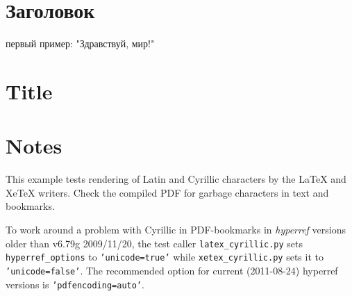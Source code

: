 \documentclass[a4paper,russian]{article}
\providecommand*{\DUroletitlereference}[1]{\textsl{#1}}
\begin{document}
\section{Заголовок%
  \label{id1}%
}

первый пример: "Здравствуй, мир!"


\section{Title%
  \label{title}%
}



\section{Notes%
  \label{notes}%
}

This example tests rendering of Latin and Cyrillic characters by the LaTeX
and XeTeX writers. Check the compiled PDF for garbage characters in text and
bookmarks.

To work around a problem with Cyrillic in PDF-bookmarks in \DUroletitlereference{hyperref}
versions older than v6.79g 2009/11/20, the test caller \texttt{latex\_cyrillic.py}
sets \texttt{hyperref\_options} to \texttt{'unicode=true'} while \texttt{xetex\_cyrillic.py}
sets it to \texttt{'unicode=false'}. The recommended option for current
(2011-08-24) hyperref versions is \texttt{'pdfencoding=auto'}.
\end{document}
